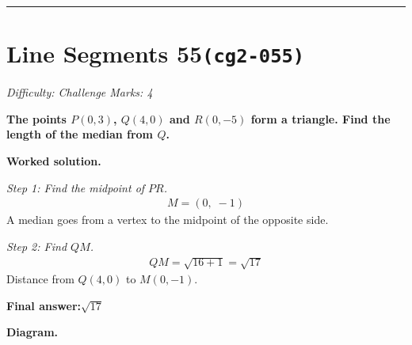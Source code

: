 \documentclass[11pt]{article}
\newcommand{\question}[1]{\par\medskip\noindent\textbf{#1}\par}
\begin{document}
\medskip\hrule

\section*{Line Segments 55\quad\small\texttt{(cg2-055)}}
\textit{Difficulty: Challenge \quad\textbar\quad Marks: 4}

\question{The points \( P(0, 3) \), \( Q(4, 0) \) and \( R(0, -5) \) form a triangle. Find the length of the median from \( Q \).}

\textbf{Worked solution.}

\textit{Step 1: Find the midpoint of \(PR\).}
\[\begin{gathered}
M = (0,\; -1)
\end{gathered}\]
A median goes from a vertex to the midpoint of the opposite side.

\textit{Step 2: Find \(QM\).}
\[\begin{gathered}
QM = \sqrt{16 + 1} = \sqrt{17}
\end{gathered}\]
Distance from \(Q(4,0)\) to \(M(0,-1)\).

\begin{answerbox}
\textbf{Final answer:}\quad \(\displaystyle \sqrt{17}\)
\end{answerbox}
\textbf{Diagram.}
\end{document}
